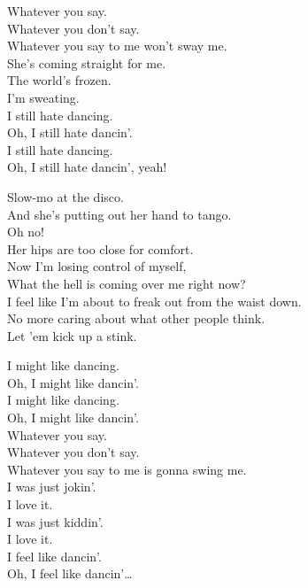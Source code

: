 Whatever you say. \\
Whatever you don't say. \\
Whatever you say to me won't sway me. \\

She's coming straight for me. \\
The world's frozen. \\
I'm sweating. \\

I still hate dancing. \\
Oh, I still hate dancin'. \\
I still hate dancing. \\
Oh, I still hate dancin', yeah! \\


Slow-mo at the disco. \\
And she's putting out her hand to tango. \\
Oh no! \\
Her hips are too close for comfort. \\
Now I'm losing control of myself, \\
What the hell is coming over me right now? \\
I feel like I'm about to freak out from the waist down. \\
No more caring about what other people think. \\
Let 'em kick up a stink. \\


I might like dancing. \\
Oh, I might like dancin'. \\
I might like dancing. \\
Oh, I might like dancin'. \\

Whatever you say. \\
Whatever you don't say. \\
Whatever you say to me is gonna swing me. \\

I was just jokin'. \\
I love it. \\
I was just kiddin'. \\
I love it. \\

I feel like dancin'. \\
Oh, I feel like dancin'… \\

